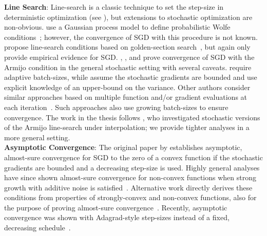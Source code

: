 \noindent \textbf{Line Search}:
Line-search is a classic technique to set the step-size in deterministic optimization (see \citet{nocedal1999numerical}), but extensions to stochastic optimization are non-obvious. 
\citet{mahsereci2017pls} use a Gaussian process model to define probabilistic Wolfe conditions~\citep{wolfe1969convergence, wolfe1971convergence}; however, the convergence of \ac{SGD} with this procedure is not known.
\citet{fridovich2019choosing} propose line-search conditions based on golden-section search~\citep{avriel1968golden}, but again only provide empirical evidence for \ac{SGD}. 
\citet{paquette2020stochastic}, \citet{krejic2013line}, and \citet{ogaltsov2019adaptive} prove convergence of \ac{SGD} with the Armijo condition in the general stochastic setting with several caveats. 
\citet{paquette2020stochastic} require adaptive batch-sizes, while \citet{krejic2013line} assume the stochastic gradients are bounded and \citet{ogaltsov2019adaptive} use explicit knowledge of an upper-bound on the variance. 
Other authors consider similar approaches based on multiple function and/or gradient evaluations at each iteration~\citep{friedlander2012hybrid, byrd2012sample, de2016big}.
Such approaches also use growing batch-sizes to ensure convergence.
The work in the thesis follows \citet{vaswani2019painless}, who investigated stochastic versions of the Armijo line-search under interpolation; we provide tighter analyses in a more general setting.\\ 


\noindent \textbf{Asymptotic Convergence}:
The original paper by \citet{robbins1951sgd} establishes asymptotic, almost-sure convergence for \ac{SGD} to the zero of a convex function if the stochastic gradients are bounded and a decreasing step-size is used.
Highly general analyses have since shown almost-sure convergence for non-convex functions when strong growth with additive noise is satisfied~\citep{bertsekas2000gradient, bottou1991approche}.
Alternative work directly derives these conditions from properties of strongly-convex and non-convex functions, also for the purpose of proving almost-sure convergence~\citep{nguyen2018sgd, lei2019stochastic}.
Recently, asymptotic convergence was shown with Adagrad-style step-sizes instead of a fixed, decreasing schedule~\citep{li2019convergence}.


\endinput
